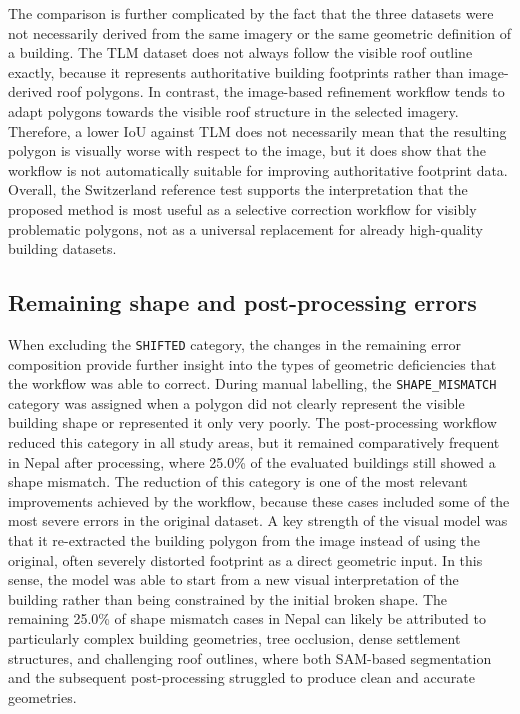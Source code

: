 The comparison is further complicated by the fact that the three datasets were not necessarily derived from the same imagery or the same geometric definition of a building. The TLM dataset does not always follow the visible roof outline exactly, because it represents authoritative building footprints rather than image-derived roof polygons. In contrast, the image-based refinement workflow tends to adapt polygons towards the visible roof structure in the selected imagery. Therefore, a lower IoU against TLM does not necessarily mean that the resulting polygon is visually worse with respect to the image, but it does show that the workflow is not automatically suitable for improving authoritative footprint data. Overall, the Switzerland reference test supports the interpretation that the proposed method is most useful as a selective correction workflow for visibly problematic polygons, not as a universal replacement for already high-quality building datasets.

\subsection{Remaining shape and post-processing errors}

When excluding the \texttt{SHIFTED} category, the changes in the remaining error composition provide further insight into the types of geometric deficiencies that the workflow was able to correct. During manual labelling, the \texttt{SHAPE\_MISMATCH} category was assigned when a polygon did not clearly represent the visible building shape or represented it only very poorly. The post-processing workflow reduced this category in all study areas, but it remained comparatively frequent in Nepal after processing, where 25.0\% of the evaluated buildings still showed a shape mismatch. The reduction of this category is one of the most relevant improvements achieved by the workflow, because these cases included some of the most severe errors in the original dataset. A key strength of the visual model was that it re-extracted the building polygon from the image instead of using the original, often severely distorted footprint as a direct geometric input. In this sense, the model was able to start from a new visual interpretation of the building rather than being constrained by the initial broken shape. The remaining 25.0\% of shape mismatch cases in Nepal can likely be attributed to particularly complex building geometries, tree occlusion, dense settlement structures, and challenging roof outlines, where both SAM-based segmentation and the subsequent post-processing struggled to produce clean and accurate geometries.

